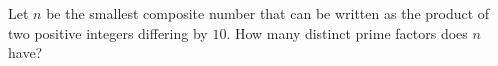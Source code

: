Let $n$ be the smallest composite number that can be written as the product of two positive integers differing by $10$. How many distinct prime factors does $n$ have?
